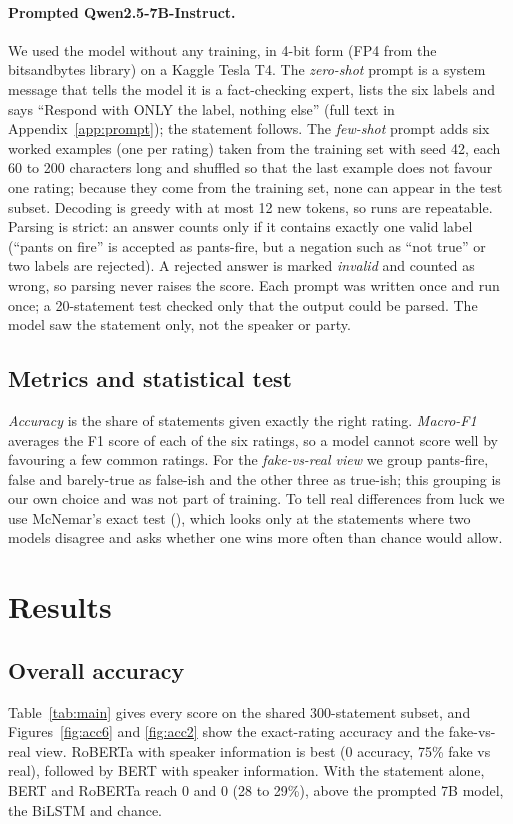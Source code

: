 \documentclass{nle}
\begin{document}
\paragraph{Prompted Qwen2.5-7B-Instruct.} We used the model without any training, in 4-bit form (FP4 from the
bitsandbytes library) on a Kaggle Tesla T4. The \emph{zero-shot} prompt is a system message that tells the model
it is a fact-checking expert, lists the six labels and says ``Respond with ONLY the label, nothing else'' (full
text in Appendix~\ref{app:prompt}); the statement follows. The \emph{few-shot} prompt adds six worked examples
(one per rating) taken from the training set with seed 42, each 60 to 200 characters long and shuffled so that the
last example does not favour one rating; because they come from the training set, none can appear in the test
subset. Decoding is greedy with at most 12 new tokens, so runs are repeatable. Parsing is strict: an answer counts
only if it contains exactly one valid label (``pants on fire'' is accepted as pants-fire, but a negation such as
``not true'' or two labels are rejected). A rejected answer is marked \emph{invalid} and counted as wrong, so
parsing never raises the score. Each prompt was written once and run once; a 20-statement test checked only that the
output could be parsed. The model saw the statement only, not the speaker or party.

\subsection{Metrics and statistical test}
\emph{Accuracy} is the share of statements given exactly the right rating. \emph{Macro-F1} averages the F1 score of
each of the six ratings, so a model cannot score well by favouring a few common ratings. For the
\emph{fake-vs-real view} we group pants-fire, false and barely-true as false-ish and the other three as true-ish;
this grouping is our own choice and was not part of training. To tell real differences from luck we use McNemar's
exact test (\cite{mcnemar47}), which looks only at the statements where two models disagree and asks whether one wins
more often than chance would allow.

\section{Results}

\subsection{Overall accuracy}
Table~\ref{tab:main} gives every score on the shared 300-statement subset, and Figures~\ref{fig:acc6} and
\ref{fig:acc2} show the exact-rating accuracy and the fake-vs-real view. RoBERTa with speaker information is best
(0 accuracy, 75\% fake vs real), followed by BERT with speaker information. With the statement alone,
BERT and RoBERTa reach 0 and 0 (28 to 29\%), above the prompted 7B model, the BiLSTM and chance.
\end{document}
